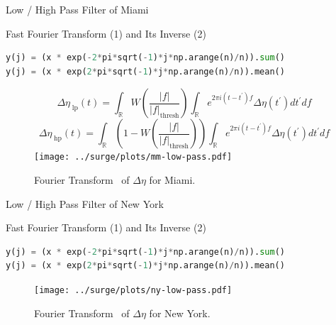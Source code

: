 \documentclass[usenames, dvipsnames]{beamer}
\begin{document}
\begin{frame}[fragile]{Low / High Pass Filter of Miami }
\vspace{-10pt}
\begin{block}{Fast Fourier Transform (1) and Its Inverse (2)}
\vspace{-10pt}
\begin{lstlisting}[firstnumber=1, language=python, label=glabels, xleftmargin=0pt]
y(j) = (x * exp(-2*pi*sqrt(-1)*j*np.arange(n)/n)).sum()
y(j) = (x * exp(2*pi*sqrt(-1)*j*np.arange(n)/n)).mean()
\end{lstlisting}
\end{block}
\vspace{-30pt}
\begin{figure}[htb!]
\begin{equation}
\Delta\eta_{\;\mathrm{lp}}(t) = \int_{\mathbb{R}}W\left(\frac{|f|}
{|f|_{\mathrm{thresh}}}\right)\int_{\mathbb{R}}e^{2\pi i (t-t^{\prime})f }
\Delta \eta(t^{\prime})dt^{\prime}df
\end{equation}
\begin{equation}
\Delta\eta_{\;\mathrm{hp}}(t) = \int_{\mathbb{R}}\left(1-W\left(\frac{|f|}
{|f|_{\mathrm{thresh}}}\right)\right)\int_{\mathbb{R}}e^{2\pi i (t-t^{\prime})f}
   \Delta \eta(t^{\prime})dt^{\prime}df
\end{equation}
    \centering
    \texttt{[image: ../surge/plots/mm-low-pass.pdf]}
    \vspace{-15pt}
    \caption{Fourier Transform~\cite{cooley1965algorithm} of $\Delta\eta$ for Miami.}
    \label{fig:A}
\end{figure}
\end{frame}

\begin{frame}[fragile]{Low / High Pass Filter of New York }
\vspace{-30pt}
\begin{block}{Fast Fourier Transform (1) and Its Inverse (2)}
\begin{lstlisting}[firstnumber=1, language=python, label=glabels, xleftmargin=0pt]
y(j) = (x * exp(-2*pi*sqrt(-1)*j*np.arange(n)/n)).sum()
y(j) = (x * exp(2*pi*sqrt(-1)*j*np.arange(n)/n)).mean()
\end{lstlisting}
\end{block}
\vspace{-20pt}
\begin{figure}[htb!]
    \centering
    \texttt{[image: ../surge/plots/ny-low-pass.pdf]}
    \vspace{-7pt}
    \caption{Fourier Transform~\cite{cooley1965algorithm} of $\Delta\eta$ for New York.}
    \label{fig:A}
\end{figure}
\end{frame}
\end{document}
